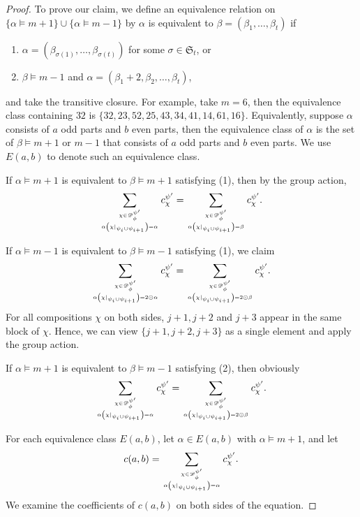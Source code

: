 \documentclass[11pt]{amsart}
\numberwithin{equation}{section}
\begin{document}
\begin{proof}
	To prove our claim, we define an equivalence relation on $\{\alpha\vDash m+1\}\cup\{\alpha\vDash m-1\}$ by $\alpha$ is equivalent to $\beta=(\beta_1,\dots,\beta_t)$ if
	\begin{enumerate}
		\item $\alpha=(\beta_{\sigma(1)},\dots,\beta_{\sigma(t)})$ for some $\sigma\in\mathfrak{S}_t$, or
		\item $\beta\vDash m-1$ and $\alpha=(\beta_1+2,\beta_2,\dots,\beta_t)$,
	\end{enumerate}
	and take the transitive closure. For example, take $m=6$, then the equivalence class containing $32$ is $\{32,23,52,25,43,34,41,14,61,16\}$. Equivalently, suppose $\alpha$ consists of $a$ odd parts and $b$ even parts, then the equivalence class of $\alpha$ is the set of $\beta\vDash m+1$ or $m-1$ that consists of $a$ odd parts and $b$ even parts. We use $E(a,b)$ to denote such an equivalence class.
	
	If $\alpha\vDash m+1$ is equivalent to $\beta\vDash m+1$ satisfying (1), then by the group action,
	$$\sum_{\chi\in\mathscr{D}_\phi^{\psi'} \atop \alpha\left(\chi|_{\psi_i\cup \psi_{i+1}}\right)=\alpha}c_\chi^{\psi'}=\sum_{\chi\in\mathscr{D}_\phi^{\psi'} \atop \alpha\left(\chi|_{\psi_i\cup \psi_{i+1}}\right)=\beta}c_\chi^{\psi'}.$$
	
	If $\alpha\vDash m-1$ is equivalent to $\beta\vDash m-1$ satisfying (1), we claim
	$$\sum_{\chi\in\mathscr{D}_\phi^{\psi'} \atop \alpha\left(\chi|_{\psi_i\cup \psi_{i+1}}\right)=2\odot\alpha}c_\chi^{\psi'}=\sum_{\chi\in\mathscr{D}_\phi^{\psi'} \atop \alpha\left(\chi|_{\psi_i\cup \psi_{i+1}}\right)=2\odot\beta}c_\chi^{\psi'}.$$
	For all compositions $\chi$ on both sides, $j+1,j+2$ and $j+3$ appear in the same block of $\chi$. Hence, we can view $\{j+1,j+2,j+3\}$ as a single element and apply the group action.
	
	If $\alpha\vDash m+1$ is equivalent to $\beta\vDash m-1$ satisfying (2), then obviously
	$$\sum_{\chi\in\mathscr{D}_\phi^{\psi'} \atop \alpha\left(\chi|_{\psi_i\cup \psi_{i+1}}\right)=\alpha}c_\chi^{\psi'}=\sum_{\chi\in\mathscr{D}_\phi^{\psi'} \atop \alpha\left(\chi|_{\psi_i\cup \psi_{i+1}}\right)=2\odot\beta}c_\chi^{\psi'}.$$
	
	For each equivalence class $E(a,b)$, let $\alpha\in E(a,b)$ with $\alpha\vDash m+1$, and let $$c(a,b)=\displaystyle\sum_{\chi\in\mathscr{D}_\phi^{\psi'} \atop \alpha\left(\chi|_{\psi_i\cup \psi_{i+1}}\right)=\alpha}c_\chi^{\psi'}.$$ We examine the coefficients of $c(a,b)$ on both sides of the equation.
	

\end{proof}
\end{document}
